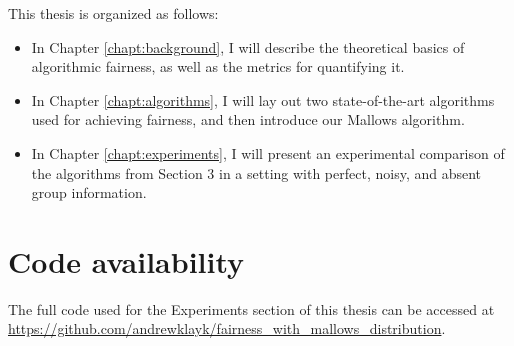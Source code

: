 This thesis is organized as follows:

\begin{itemize}
\item In Chapter \ref{chapt:background}, I will describe the theoretical basics of algorithmic fairness, as well as the metrics for quantifying it.
\item In Chapter \ref{chapt:algorithms}, I will lay out two state-of-the-art algorithms used for achieving fairness, and then introduce our Mallows algorithm.
\item In Chapter \ref{chapt:experiments}, I will present an experimental comparison of the algorithms from Section 3 in a setting with perfect, noisy, and absent group information.
\end{itemize}


\section{Code availability}\label{sect:code_availability}

The full code used for the Experiments section of this thesis can be accessed at \url{https://github.com/andrewklayk/fairness_with_mallows_distribution}.
